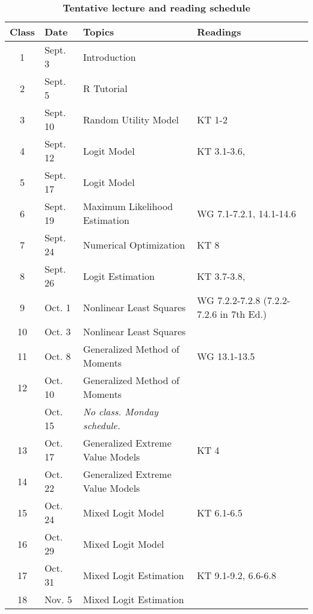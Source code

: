 \documentclass[11pt,letterpaper]{article}
\begin{document}
\begin{NoHyper}
\begin{table}[!ht]
	\centering
	\begin{threeparttable}
		\caption*{\textbf{Tentative lecture and reading schedule}}
   		\begin{tabular}{@{\extracolsep{0.35cm}} c l l l @{}}
    		\toprule
		    \textbf{Class} & \textbf{Date} & \textbf{Topics} & \textbf{Readings}\tnote{1} \\ \toprule
    		1 & Sept. 3 & Introduction & \\
    		2 & Sept. 5 & R Tutorial & \textcite{reiss_structural_2007}\\
    		3 & Sept. 10 & Random Utility Model & KT 1-2\\
    		4 & Sept. 12 & Logit Model & KT 3.1-3.6, \textcite{gruber_tax_1994} \\
    		5 & Sept. 17 & Logit Model & \textcite{adamowicz_combining_1994} \\
    		6 & Sept. 19 & Maximum Likelihood Estimation & WG 7.1-7.2.1, 14.1-14.6 \\
    		7 & Sept. 24 & Numerical Optimization & KT 8 \\
    		8 & Sept. 26 & Logit Estimation & KT 3.7-3.8, \textcite{bayer_migration_2009} \\
    		9 & Oct. 1 & Nonlinear Least Squares & WG 7.2.2-7.2.8 (7.2.2-7.2.6 in 7th Ed.) \\
    		10 & Oct. 3 & Nonlinear Least Squares & \textcite{schaefer_dependence_1998} \\
    		11 & Oct. 8 & Generalized Method of Moments & WG 13.1-13.5 \\
    		12 & Oct. 10 & Generalized Method of Moments & \textcite{crawford_welfare_2012} \\
    		& Oct. 15 & \emph{No class. Monday schedule.} & \\
    		13 & Oct. 17 & Generalized Extreme Value Models & KT 4 \\
    		14 & Oct. 22 & Generalized Extreme Value Models & \textcite{train_demand_1987} \\
    		15 & Oct. 24 & Mixed Logit Model & KT 6.1-6.5 \\
    		16 & Oct. 29 & Mixed Logit Model & \textcite{revelt_mixed_1998} \\
    		17 & Oct. 31 & Mixed Logit Estimation & KT 9.1-9.2, 6.6-6.8 \\
    		18 & Nov. 5 & Mixed Logit Estimation & \textcite{handel_adverse_2013} \\

\end{tabular}
\end{threeparttable}
\end{table}
\end{NoHyper}
\end{document}
